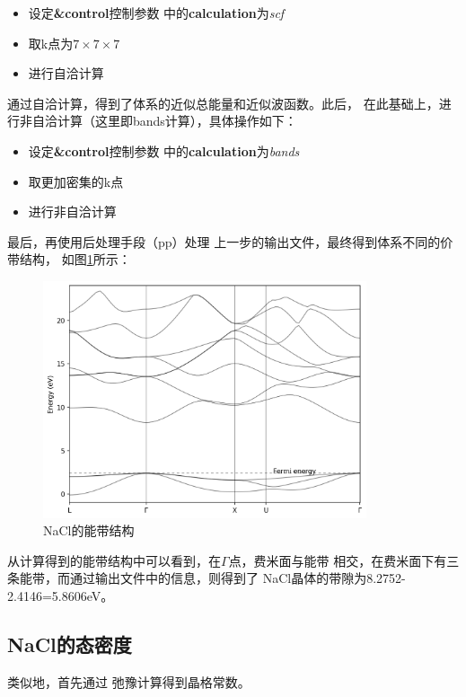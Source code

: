 \documentclass[UTF8]{ctexart}
\numberwithin{figure}{section}  %
\numberwithin{table}{section}
\numberwithin{equation}{section}
\begin{document}
        \begin{itemize}
            \item 设定\textbf{\&control}控制参数
            中的\textbf{calculation}为\emph{scf}
            \item 取k点为$7\times 7\times 7$
            \item 进行自洽计算
        \end{itemize}

        通过自洽计算，得到了体系的近似总能量和近似波函数。此后，
    在此基础上，进行非自洽计算（这里即bands计算），具体操作如下：

        \begin{itemize}
            \item 设定\textbf{\&control}控制参数
            中的\textbf{calculation}为\emph{bands}
            \item 取更加密集的k点
            \item 进行非自洽计算
        \end{itemize}

        最后，再使用后处理手段（pp）处理
        上一步的输出文件，最终得到体系不同的价带结构，
        如图\ref{Fig:5}所示：

        \begin{figure}[H]
            \centering
            \includegraphics[width=0.85\textwidth]{band_structure.png}
            \caption{NaCl的能带结构}
            \label{Fig:5}
        \end{figure}

        从计算得到的能带结构中可以看到，在$\Gamma$点，费米面与能带
    相交，在费米面下有三条能带，而通过输出文件中的信息，则得到了
    NaCl晶体的带隙为8.2752-2.4146=5.8606eV。
             

    \subsection{NaCl的态密度}
        类似地，首先通过
        弛豫计算得到晶格常数。\par 
\end{document}

